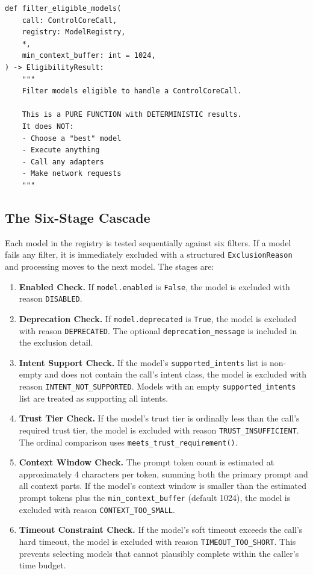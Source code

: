 \documentclass[11pt,a4paper]{article}
\theoremstyle{plain}
\theoremstyle{definition}
\begin{document}
\begin{lstlisting}[style=pythonstyle, caption={filter\_eligible\_models signature and purity contract from \texttt{dial.py}}]
def filter_eligible_models(
    call: ControlCoreCall,
    registry: ModelRegistry,
    *,
    min_context_buffer: int = 1024,
) -> EligibilityResult:
    """
    Filter models eligible to handle a ControlCoreCall.

    This is a PURE FUNCTION with DETERMINISTIC results.
    It does NOT:
    - Choose a "best" model
    - Execute anything
    - Call any adapters
    - Make network requests
    """
\end{lstlisting}

\subsection{The Six-Stage Cascade}

Each model in the registry is tested sequentially against six filters. If a
model fails any filter, it is immediately excluded with a structured
\texttt{ExclusionReason} and processing moves to the next model. The stages
are:

\begin{enumerate}[leftmargin=2em]
\item \textbf{Enabled Check.} If \texttt{model.enabled} is \texttt{False}, the
  model is excluded with reason \texttt{DISABLED}.

\item \textbf{Deprecation Check.} If \texttt{model.deprecated} is
  \texttt{True}, the model is excluded with reason \texttt{DEPRECATED}. The
  optional \texttt{deprecation\_message} is included in the exclusion detail.

\item \textbf{Intent Support Check.} If the model's
  \texttt{supported\_intents} list is non-empty and does not contain the call's
  intent class, the model is excluded with reason
  \texttt{INTENT\_NOT\_SUPPORTED}. Models with an empty
  \texttt{supported\_intents} list are treated as supporting all intents.

\item \textbf{Trust Tier Check.} If the model's trust tier is ordinally less
  than the call's required trust tier, the model is excluded with reason
  \texttt{TRUST\_INSUFFICIENT}. The ordinal comparison uses
  \texttt{meets\_trust\_requirement()}.

\item \textbf{Context Window Check.} The prompt token count is estimated at
  approximately 4 characters per token, summing both the primary prompt and all
  context parts. If the model's context window is smaller than the estimated
  prompt tokens plus the \texttt{min\_context\_buffer} (default 1024), the
  model is excluded with reason \texttt{CONTEXT\_TOO\_SMALL}.

\item \textbf{Timeout Constraint Check.} If the model's soft timeout exceeds
  the call's hard timeout, the model is excluded with reason
  \texttt{TIMEOUT\_TOO\_SHORT}. This prevents selecting models that cannot
  plausibly complete within the caller's time budget.
\end{enumerate}
\end{document}
